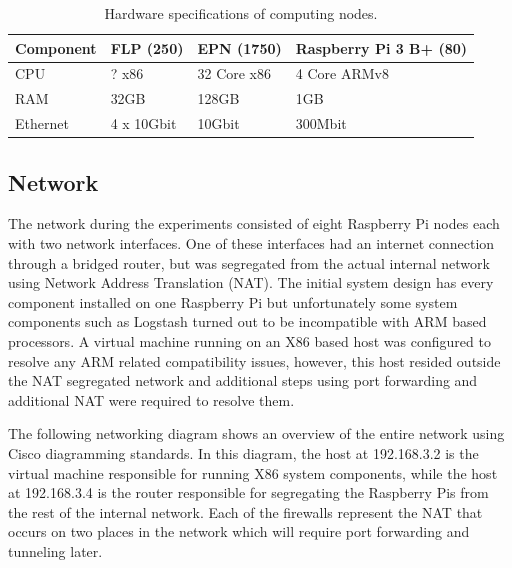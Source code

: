 \documentclass[]{article}
\begin{document}
\begin{table}[H]
	\begin{center}
		\begin{tabular}{ | l | l | l | l | }
			\hline
			\textbf{Component} & \textbf{FLP (250)} & \textbf{EPN (1750)} & \textbf{Raspberry Pi 3 B+ (80)} \\ \hline
			
			CPU & ? x86 & 32 Core x86 & 4 Core ARMv8 \\ \hline
			RAM & 32GB & 128GB & 1GB \\ \hline
			Ethernet & 4 x 10Gbit & 10Gbit & 300Mbit \\ \hline
		\end{tabular}
		\caption{Hardware specifications of computing nodes.}
		\label{tab:specs}
	\end{center}
\end{table}

\subsection{Network}
The network during the experiments consisted of eight Raspberry Pi nodes each with two network interfaces. One of these interfaces had an internet connection through a bridged router, but was segregated from the actual internal network using Network Address Translation (NAT). The initial system design has every component installed on one Raspberry Pi but unfortunately some system components such as Logstash turned out to be incompatible with ARM based processors. A virtual machine running on an X86 based host was configured to resolve any ARM related compatibility issues, however, this host resided outside the NAT segregated network and additional steps using port forwarding and additional NAT were required to resolve them.

The following networking diagram shows an overview of the entire network using Cisco diagramming standards. In this diagram, the host at 192.168.3.2 is the virtual machine responsible for running X86 system components, while the host at 192.168.3.4 is the router responsible for segregating the Raspberry Pis from the rest of the internal network. Each of the firewalls represent the NAT that occurs on two places in the network which will require port forwarding and tunneling later.
\end{document}
